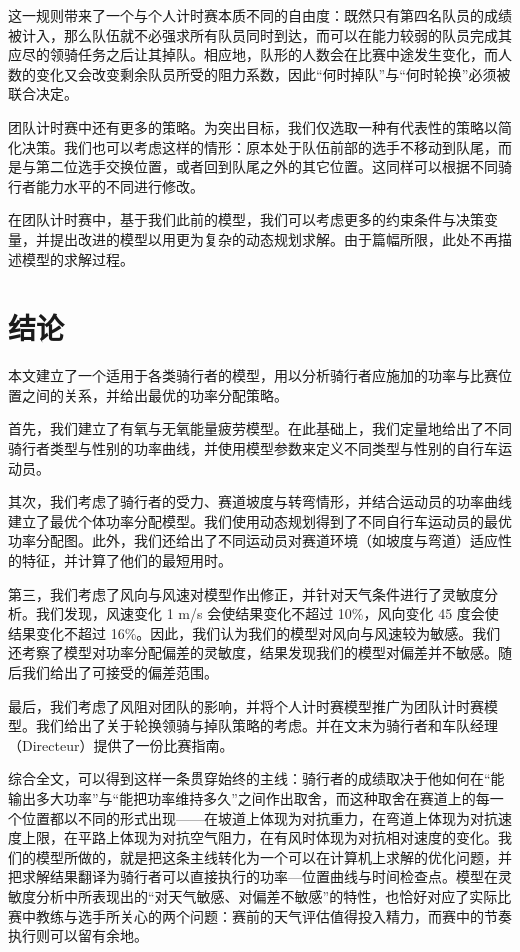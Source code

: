 \documentclass[11pt,a4paper]{ctexart}
\begin{document}
这一规则带来了一个与个人计时赛本质不同的自由度：既然只有第四名队员的成绩被计入，那么队伍就不必强求所有队员同时到达，而可以在能力较弱的队员完成其应尽的领骑任务之后让其掉队。相应地，队形的人数会在比赛中途发生变化，而人数的变化又会改变剩余队员所受的阻力系数，因此“何时掉队”与“何时轮换”必须被联合决定。

团队计时赛中还有更多的策略。为突出目标，我们仅选取一种有代表性的策略以简化决策。我们也可以考虑这样的情形：原本处于队伍前部的选手不移动到队尾，而是与第二位选手交换位置，或者回到队尾之外的其它位置。这同样可以根据不同骑行者能力水平的不同进行修改。

在团队计时赛中，基于我们此前的模型，我们可以考虑更多的约束条件与决策变量，并提出改进的模型以用更为复杂的动态规划求解。由于篇幅所限，此处不再描述模型的求解过程。

\section{结论}

本文建立了一个适用于各类骑行者的模型，用以分析骑行者应施加的功率与比赛位置之间的关系，并给出最优的功率分配策略。

首先，我们建立了有氧与无氧能量疲劳模型。在此基础上，我们定量地给出了不同骑行者类型与性别的功率曲线，并使用模型参数来定义不同类型与性别的自行车运动员。

其次，我们考虑了骑行者的受力、赛道坡度与转弯情形，并结合运动员的功率曲线建立了最优个体功率分配模型。我们使用动态规划得到了不同自行车运动员的最优功率分配图。此外，我们还给出了不同运动员对赛道环境（如坡度与弯道）适应性的特征，并计算了他们的最短用时。

第三，我们考虑了风向与风速对模型作出修正，并针对天气条件进行了灵敏度分析。我们发现，风速变化 1 m/s 会使结果变化不超过 10\%，风向变化 45 度会使结果变化不超过 16\%。因此，我们认为我们的模型对风向与风速较为敏感。我们还考察了模型对功率分配偏差的灵敏度，结果发现我们的模型对偏差并不敏感。随后我们给出了可接受的偏差范围。

最后，我们考虑了风阻对团队的影响，并将个人计时赛模型推广为团队计时赛模型。我们给出了关于轮换领骑与掉队策略的考虑。并在文末为骑行者和车队经理（Directeur）提供了一份比赛指南。

综合全文，可以得到这样一条贯穿始终的主线：骑行者的成绩取决于他如何在“能输出多大功率”与“能把功率维持多久”之间作出取舍，而这种取舍在赛道上的每一个位置都以不同的形式出现——在坡道上体现为对抗重力，在弯道上体现为对抗速度上限，在平路上体现为对抗空气阻力，在有风时体现为对抗相对速度的变化。我们的模型所做的，就是把这条主线转化为一个可以在计算机上求解的优化问题，并把求解结果翻译为骑行者可以直接执行的功率—位置曲线与时间检查点。模型在灵敏度分析中所表现出的“对天气敏感、对偏差不敏感”的特性，也恰好对应了实际比赛中教练与选手所关心的两个问题：赛前的天气评估值得投入精力，而赛中的节奏执行则可以留有余地。
\end{document}
